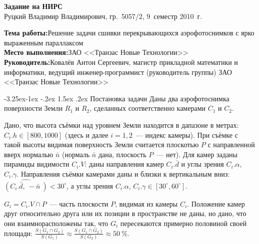 \documentclass[a4paper,10pt]{article}
\makeatletter
\renewcommand\paragraph{\@startsection{paragraph}{4}{\z@}%
  {-3.25ex\@plus -1ex \@minus -.2ex}%
  {1.5ex \@plus .2ex}%
  {\normalfont\normalsize\bfseries}}
\makeatother
\begin{document}
\begin{center}
\begin{spacing}{1.5}
  {\Large\bfseries Задание на НИРС} \\
  {\large Руцкий Владимир Владимирович, гр.~5057/2, 9~семестр 2010~г.}
\end{spacing}
\end{center}

\noindent\textbf{Тема работы:}\quad Решение задачи сшивки перекрывающихся аэрофотоснимков с ярко выраженным параллаксом \\
\textbf{Место выполнения:}\quad ЗАО <<Транзас Новые Технологии>> \\
\textbf{Руководитель:}\quad Ковалёв Антон Сергеевич, 
магистр прикладной математики и информатики, 
ведущий инженер-программист (руководитель группы) ЗАО <<Транзас Новые Технологии>>

\paragraph{Постановка задачи}
Даны два аэрофотоснимка поверхности Земли $R_1$ и $R_2$, 
сделанных соответственно камерами $C_1$ и $C_2$.

Дано, что высота съёмки над уровнем Земли находится в дапазоне в метрах: $C_i.h \in [800, 1000]$ (здесь и далее $i=1,2$~--- индекс камеры).
При съёмке с такой высоты видимая поверхность Земли считается плоскотью $P$ с направленной вверх нормалью $\bar{n}$
(нормаль $\bar{n}$ дана, плоскость $P$~--- нет).
Для камер заданы пирамиды видимости $C_i.V$: 
даны направления камер $C_i.\bar{d}$ и углы зрения $C_i.\alpha$, $C_i.\gamma$.
Направления съёмки камерами даны и близки к вертикальным вниз: $\widehat{(C_i.\bar{d}, \ -\bar{n}\ )} < 30^{\circ}$,
а углы зрения $C_i.\alpha$, $C_i.\gamma \in [30^{\circ}, 60^{\circ}]$.

$G_i = C_i.V \cap P$~--- часть плоскости $P$, видимая из камеры $C_i$.
Положение камер друг относительно друга или их позиции в пространстве не даны, но
дано, что они взаимнорасположены так, что $G_i$ пересекаются примерно половиной своей площади:
$\frac{S(G_1 \cap G_2)}{S(G_1)} \approx \frac{S(G_1 \cap G_2)}{S(G_2)} \approx 50~\%$.
\end{document}
